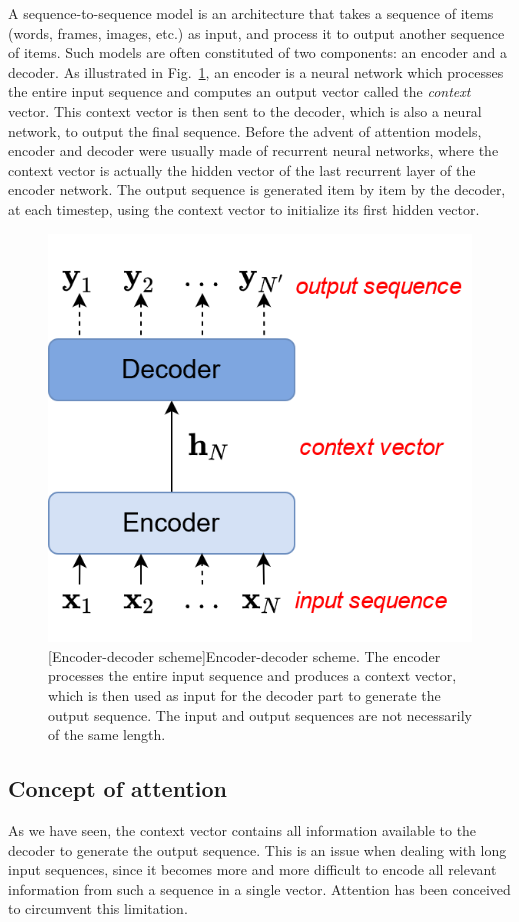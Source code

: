 A sequence-to-sequence model is an architecture that takes a sequence of items (words, frames, images, etc.) as input, and process it to output another sequence of items. Such models are often constituted of two components: an encoder and a decoder. As illustrated in Fig.~\ref{fig:encoderDecoder}, an encoder is a neural network which processes the entire input sequence and computes an output vector called the \textit{context} vector. This context vector is then sent to the decoder, which is also a neural network, to output the final sequence. Before the advent of attention models, encoder and decoder were usually made of recurrent neural networks, where the context vector is actually the hidden vector of the last recurrent layer of the encoder network. The output sequence is generated item by item by the decoder, at each timestep, using the context vector to initialize its first hidden vector.

\begin{figure}[t]
    \begin{center}
    \includegraphics[width=0.5\linewidth]{Images/chap3/encoderDecoder.png}
    [Encoder-decoder scheme]{Encoder-decoder scheme. The encoder processes the entire input sequence and produces a context vector, which is then used as input for the decoder part to generate the output sequence. The input and output sequences are not necessarily of the same length.}
    \label{fig:encoderDecoder}
    \end{center}
\end{figure}


\subsection{Concept of attention}
\label{sec:attention}

As we have seen, the context vector contains all information available to the decoder to generate the output sequence. This is an issue when dealing with long input sequences, since it becomes more and more difficult to encode all relevant information from such a sequence in a single vector. Attention has been conceived to circumvent this limitation.

